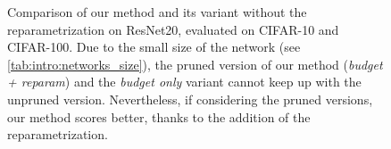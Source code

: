 \begin{figure}
  \centering
  \caption{Comparison of our method and its variant without the
    reparametrization on ResNet20, evaluated on CIFAR-10 and CIFAR-100. Due to the
    small size of the network (see \cref{tab:intro:networks_size}), the pruned
    version of our method (\emph{budget + reparam}) and the \emph{budget only}
    variant cannot keep up with the unpruned version. Nevertheless, if considering
    the pruned versions, our method scores better, thanks to the addition of the
    reparametrization.}
  \label{fig:chap1:budget_only_resnet20}
\end{figure}

